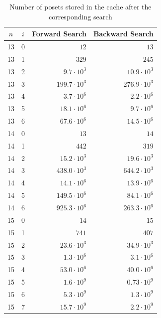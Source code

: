 \documentclass[10pt,journal,compsoc]{IEEEtran}
\begin{document}
\begin{table}[!t]
  \renewcommand{\arraystretch}{1.2}
  \caption{Number of posets stored in the cache after the corresponding search}
  \label{table:cache_entries}
  \centering
  \begin{tabular}{c|c|r|r}
    $n$ & $i$ & \textbf{Forward Search} & \textbf{Backward Search} \\
    \hline
    13  & 0   & $12$                    & $13$                     \\
    13  & 1   & $329$                   & $245$                    \\
    13  & 2   & $9.7 \cdot 10^3$        & $10.9 \cdot 10^3$        \\
    13  & 3   & $199.7 \cdot 10^3$      & $276.9 \cdot 10^3$       \\
    13  & 4   & $3.7 \cdot 10^6$        & $2.2 \cdot 10^6$         \\
    13  & 5   & $18.1 \cdot 10^6$       & $9.7 \cdot 10^6$         \\
    13  & 6   & $67.6 \cdot 10^6$       & $14.5 \cdot 10^6$        \\
    \hline
    14  & 0   & $13$                    & $14$                     \\
    14  & 1   & $442$                   & $319$                    \\
    14  & 2   & $15.2 \cdot 10^3$       & $19.6 \cdot 10^3$        \\
    14  & 3   & $438.0 \cdot 10^3$      & $644.2 \cdot 10^3$       \\
    14  & 4   & $14.1 \cdot 10^6$       & $13.9 \cdot 10^6$        \\
    14  & 5   & $149.5 \cdot 10^6$      & $84.1 \cdot 10^6$        \\
    14  & 6   & $925.3 \cdot 10^6$      & $263.3 \cdot 10^6$       \\
    \hline
    15  & 0   & $14$                    & $15$                     \\
    15  & 1   & $741$                   & $407$                    \\
    15  & 2   & $23.6 \cdot 10^3$       & $34.9 \cdot 10^3$        \\
    15  & 3   & $1.3 \cdot 10^6$        & $3.1 \cdot 10^6$         \\
    15  & 4   & $53.0 \cdot 10^6$       & $40.0 \cdot 10^6$        \\
    15  & 5   & $1.6 \cdot 10^9$        & $0.73 \cdot 10^9$        \\
    15  & 6   & $5.3 \cdot 10^9$        & $1.3 \cdot 10^9$         \\
    15  & 7   & $15.7 \cdot 10^9$       & $2.2 \cdot 10^9$         \\
  \end{tabular}
\end{table}
\end{document}
